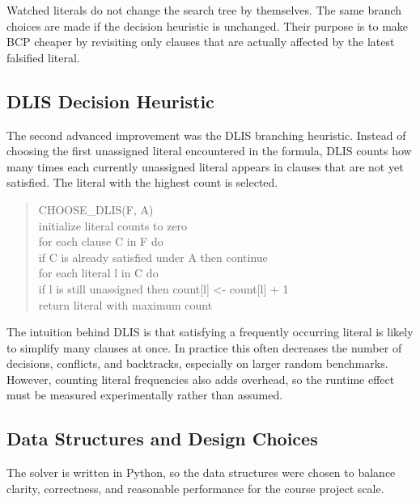 \documentclass[11pt]{article}
\begin{document}
Watched literals do not change the search tree by themselves. The same branch
choices are made if the decision heuristic is unchanged. Their purpose is to
make BCP cheaper by revisiting only clauses that are actually affected by the
latest falsified literal.

\subsection{DLIS Decision Heuristic}

The second advanced improvement was the DLIS branching heuristic. Instead of
choosing the first unassigned literal encountered in the formula, DLIS counts
how many times each currently unassigned literal appears in clauses that are not
yet satisfied. The literal with the highest count is selected.

\begin{quote}
\small
\ttfamily
\raggedright
CHOOSE\_DLIS(F, A)\\
\hspace*{1em}initialize literal counts to zero\\
\hspace*{1em}for each clause C in F do\\
\hspace*{2em}if C is already satisfied under A then continue\\
\hspace*{2em}for each literal l in C do\\
\hspace*{3em}if l is still unassigned then count[l] <- count[l] + 1\\
\hspace*{1em}return literal with maximum count
\end{quote}

The intuition behind DLIS is that satisfying a frequently occurring literal is
likely to simplify many clauses at once. In practice this often decreases the
number of decisions, conflicts, and backtracks, especially on larger random
benchmarks. However, counting literal frequencies also adds overhead, so the
runtime effect must be measured experimentally rather than assumed.

\subsection{Data Structures and Design Choices}

The solver is written in Python, so the data structures were chosen to balance
clarity, correctness, and reasonable performance for the course project scale.
\end{document}
